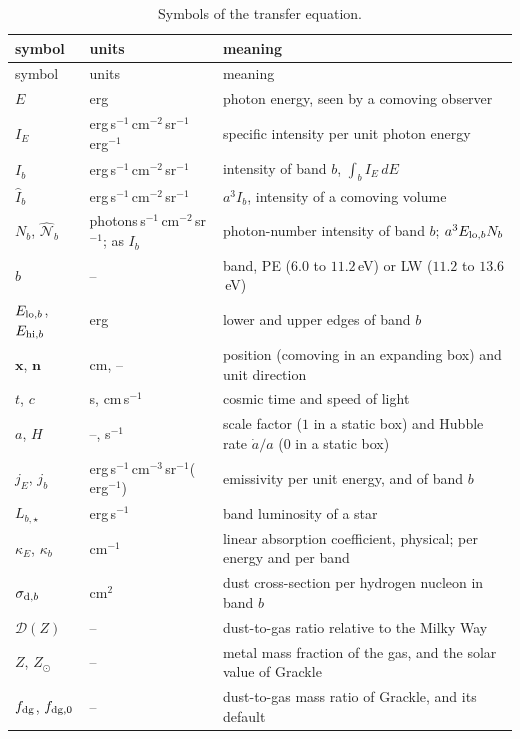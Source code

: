 {\small
\begin{longtable}{>{\raggedright\arraybackslash}p{2.4cm}>{\raggedright\arraybackslash}p{4.4cm}>{\raggedright\arraybackslash}p{7.4cm}}
\caption{Symbols of the transfer equation.}
\label{tab:isrf-rte-symbols}\\
\toprule
symbol & units & meaning \\
\midrule
\endfirsthead
\toprule
symbol & units & meaning \\
\midrule
\endhead
$E$ & erg & photon energy, seen by a comoving observer \\
$I_E$ & erg\,s$^{-1}$\,cm$^{-2}$\,sr$^{-1}$\,erg$^{-1}$ & specific intensity per unit photon energy \\
$I_b$ & erg\,s$^{-1}$\,cm$^{-2}$\,sr$^{-1}$ & intensity of band $b$, $\int_b I_E\,dE$ \\
$\hat I_b$ & erg\,s$^{-1}$\,cm$^{-2}$\,sr$^{-1}$ & $a^3I_b$, intensity of a comoving volume \\
$N_b$, $\hat{\mathcal N}_b$ & photons\,s$^{-1}$\,cm$^{-2}$\,sr$^{-1}$; as $I_b$ & photon-number intensity of band $b$; $a^3E_{{\rm lo},b}N_b$ \\
$b$ & -- & band, PE ($6.0$ to $11.2$\,eV) or LW ($11.2$ to $13.6$\,eV) \\
$E_{{\rm lo},b}$, $E_{{\rm hi},b}$ & erg & lower and upper edges of band $b$ \\
$\boldsymbol{x}$, $\boldsymbol{n}$ & cm, -- & position (comoving in an expanding box) and unit direction \\
$t$, $c$ & s, cm\,s$^{-1}$ & cosmic time and speed of light \\
$a$, $H$ & --, s$^{-1}$ & scale factor ($1$ in a static box) and Hubble rate $\dot a/a$ ($0$ in a static box) \\
$j_E$, $j_b$ & erg\,s$^{-1}$\,cm$^{-3}$\,sr$^{-1}$(\,erg$^{-1}$) & emissivity per unit energy, and of band $b$ \\
$L_{b,\star}$ & erg\,s$^{-1}$ & band luminosity of a star \\
$\kappa_E$, $\kappa_b$ & cm$^{-1}$ & linear absorption coefficient, physical; per energy and per band \\
$\sigma_{{\rm d},b}$ & cm$^2$ & dust cross-section per hydrogen nucleon in band $b$ \\
$\mathcal D(Z)$ & -- & dust-to-gas ratio relative to the Milky Way \\
$Z$, $Z_\odot$ & -- & metal mass fraction of the gas, and the solar value of Grackle \\
$f_{\rm dg}$, $f_{{\rm dg},0}$ & -- & dust-to-gas mass ratio of Grackle, and its default \\

\end{longtable}}
